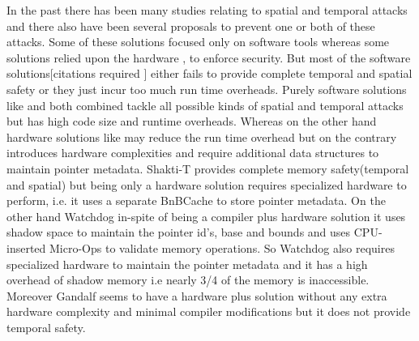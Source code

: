In the past there has been many studies relating to spatial and temporal attacks \cite{BaggyBounds, Valgrind,CCured,SoftBound,Mudflap,BackwardChecking,LLP,DFI,DieHard,Austin,CETS,Fischer,ComprehesiveMemsafety,Watchdog,Hardbound,AccMetaDataChecks,IGPM} and there also have been several proposals to prevent one or both of these attacks. Some of these solutions focused only on software tools \cite{BaggyBounds, Valgrind,CCured,SoftBound,Mudflap,BackwardChecking,LLP,DFI,DieHard,Austin,CETS} whereas some solutions relied upon the hardware \cite{Fischer,ComprehesiveMemsafety,Watchdog,Hardbound,AccMetaDataChecks,IGPM}, to enforce security. But most of the software solutions[citations required ] either fails to provide complete temporal and spatial safety or they just incur too much run time overheads. Purely software solutions like \cite{SoftBound} and \cite{CETS} both combined tackle all possible kinds of spatial and temporal attacks but has high code size and runtime overheads. Whereas on the other hand hardware solutions like \cite{Shakti-T,Watchdog} may reduce the run time overhead but on the contrary introduces hardware complexities and require additional data structures to maintain pointer metadata. Shakti-T\cite{Shakti-T} provides complete memory safety(temporal and spatial) but being only a hardware solution requires specialized hardware to perform, i.e. it uses a separate BnBCache to store pointer metadata. On the other hand Watchdog\cite{Watchdog} in-spite of being a compiler plus hardware solution it uses shadow space to maintain the pointer id's, base and bounds and uses CPU-inserted Micro-Ops to validate memory operations. So Watchdog also requires  specialized hardware to maintain the pointer metadata and it has a high overhead of shadow memory i.e nearly 3/4 of the memory is inaccessible. Moreover Gandalf\cite{Gandlaf} seems to have a hardware plus solution without any extra hardware complexity and minimal compiler modifications but it does not provide temporal safety.\\

